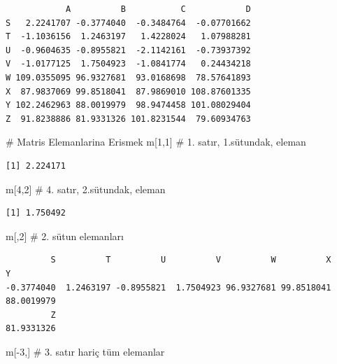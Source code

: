 \documentclass[
  letterpaper,
  DIV=11,
  numbers=noendperiod]{scrreprt}
\newenvironment{Shaded}{\begin{snugshade}}{\end{snugshade}}
\newcommand{\CommentTok}[1]{\textcolor[rgb]{0.37,0.37,0.37}{#1}}
\newcommand{\DecValTok}[1]{\textcolor[rgb]{0.68,0.00,0.00}{#1}}
\newcommand{\NormalTok}[1]{\textcolor[rgb]{0.00,0.23,0.31}{#1}}
\newcommand{\SpecialCharTok}[1]{\textcolor[rgb]{0.37,0.37,0.37}{#1}}
\begin{document}
\begin{verbatim}
            A          B           C            D
S   2.2241707 -0.3774040  -0.3484764  -0.07701662
T  -1.1036156  1.2463197   1.4228024   1.07988281
U  -0.9604635 -0.8955821  -2.1142161  -0.73937392
V  -1.0177125  1.7504923  -1.0841774   0.24434218
W 109.0355095 96.9327681  93.0168698  78.57641893
X  87.9837069 99.8518041  87.9869010 108.87601335
Y 102.2462963 88.0019979  98.9474458 101.08029404
Z  91.8238886 81.9331326 101.8231544  79.60934763
\end{verbatim}

\begin{Shaded}
\begin{Highlighting}[]
\CommentTok{\# Matris Elemanlarina Erismek}
\NormalTok{m[}\DecValTok{1}\NormalTok{,}\DecValTok{1}\NormalTok{] }\CommentTok{\# 1. satır, 1.sütundak, eleman}
\end{Highlighting}
\end{Shaded}

\begin{verbatim}
[1] 2.224171
\end{verbatim}

\begin{Shaded}
\begin{Highlighting}[]
\NormalTok{m[}\DecValTok{4}\NormalTok{,}\DecValTok{2}\NormalTok{] }\CommentTok{\# 4. satır, 2.sütundak, eleman}
\end{Highlighting}
\end{Shaded}

\begin{verbatim}
[1] 1.750492
\end{verbatim}

\begin{Shaded}
\begin{Highlighting}[]
\NormalTok{m[,}\DecValTok{2}\NormalTok{] }\CommentTok{\# 2. sütun elemanları}
\end{Highlighting}
\end{Shaded}

\begin{verbatim}
         S          T          U          V          W          X          Y 
-0.3774040  1.2463197 -0.8955821  1.7504923 96.9327681 99.8518041 88.0019979 
         Z 
81.9331326 
\end{verbatim}

\begin{Shaded}
\begin{Highlighting}[]
\NormalTok{m[}\SpecialCharTok{{-}}\DecValTok{3}\NormalTok{,] }\CommentTok{\# 3. satır hariç tüm elemanlar}
\end{Highlighting}
\end{Shaded}
\end{document}
